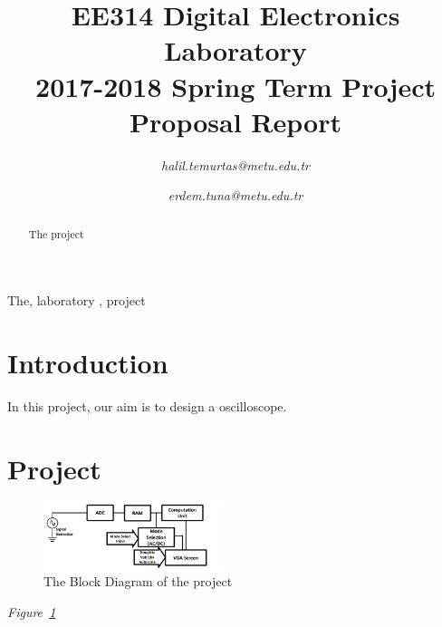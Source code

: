 \documentclass[paper]{IEEEtran}
\begin{document}
\title{EE314 Digital Electronics Laboratory\\
2017-2018 Spring Term Project Proposal Report
}


\author{

\textit{halil.temurtas@metu.edu.tr}

\and

\textit{erdem.tuna@metu.edu.tr}


}

\maketitle

\begin{abstract}

The project 

\end{abstract}

\begin{IEEEkeywords}
The, laboratory , project
\end{IEEEkeywords}

\section{Introduction}
\- \indent
	In this project, our aim is to design a oscilloscope.


\section{Project}
\- \indent


\begin{figure}[h!]
	\setlength{\unitlength}{\textwidth}
	\center 
	\includegraphics[width=0.47\textwidth]{block_diagram}
	\caption{\label{fig:block_diagram}The Block Diagram of the project}
\end{figure}

	 \textit{Figure~\ref{fig:block_diagram}}    

	
\end{document}
